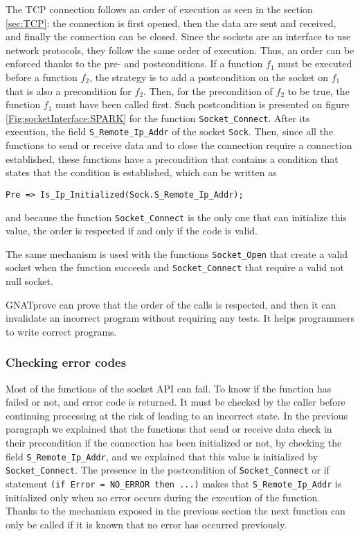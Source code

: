 \documentclass[runningheads]{llncs}
\begin{document}
    The TCP connection follows an order of execution as seen in the section \ref{sec:TCP}: the connection is first opened,
    then the data are sent and received, and finally the connection can be closed. Since the sockets are an interface to use
    network protocols, they follow the same order of execution. Thus, an order can be enforced thanks to the pre- and postconditions.
    If a function $f_1$ must be executed before a function $f_2$, the strategy is to add a postcondition on the socket on $f_1$
    that is also a precondition for $f_2$. Then, for the precondition of $f_2$ to be true, the function $f_1$ must have been called first.
    Such postcondition is presented on figure \ref{Fig:socketInterface:SPARK} for the function \lstinline{Socket_Connect}. After its
    execution, the field \lstinline{S_Remote_Ip_Addr} of the socket \lstinline{Sock}. Then, since all the functions to send or receive
    data and to close the connection require a connection established, these functions have a precondition that contains a condition
    that states that the condition is established, which can be written as
    \begin{lstlisting}
Pre => Is_Ip_Initialized(Sock.S_Remote_Ip_Addr);
    \end{lstlisting}
    and because the function \lstinline{Socket_Connect} is the only one that can initialize this value, the order is respected
    if and only if the code is valid.

    The same mechanism is used with the functions \lstinline{Socket_Open} that create a valid socket when the function
    succeeds and \lstinline{Socket_Connect} that require a valid not null socket.

    GNATprove can prove that the order of the calls is respected, and then it can invalidate an incorrect program without requiring any
    tests. It helps programmers to write correct programs.


\subsubsection{Checking error codes}

    Most of the functions of the socket API can fail. To know if the function has failed or not, and error code is returned.
    It must be checked by the caller before continuing processing at the risk of leading to an incorrect state.
    In the previous paragraph we explained that the functions that send or receive data check in their precondition if the connection
    has been initialized or not, by checking the field \lstinline{S_Remote_Ip_Addr}, and we explained that this value is initialized
    by \lstinline{Socket_Connect}. The presence in the postcondition of \lstinline{Socket_Connect} or if statement
    \lstinline{(if Error = NO_ERROR then ...)} makes that \lstinline{S_Remote_Ip_Addr} is initialized only when no error occurs during
    the execution of the function. Thanks to the mechanism exposed in the previous section the next function can only be called
    if it is known that no error has occurred previously.
\end{document}
